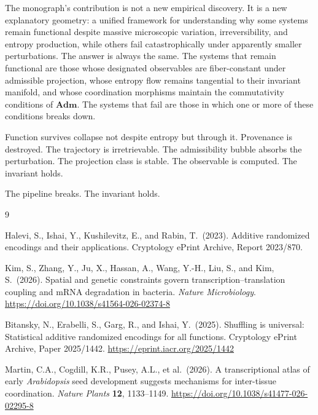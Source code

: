 \documentclass[12pt, a4paper]{article}
\theoremstyle{essaystyle}
\begin{document}
The monograph's contribution is not a new empirical discovery. It is a new
explanatory geometry: a unified framework for understanding why some systems remain
functional despite massive microscopic variation, irreversibility, and entropy
production, while others fail catastrophically under apparently smaller perturbations.
The answer is always the same. The systems that remain functional are those whose
designated observables are fiber-constant under admissible projection, whose entropy
flow remains tangential to their invariant manifold, and whose coordination morphisms
maintain the commutativity conditions of $\mathbf{Adm}$. The systems that fail are
those in which one or more of these conditions breaks down.

Function survives collapse not despite entropy but through it. Provenance is destroyed.
The trajectory is irretrievable. The admissibility bubble absorbs the perturbation.
The projection class is stable. The observable is computed. The invariant holds.

The pipeline breaks. The invariant holds.

\newpage

\begin{thebibliography}{9}

Halevi, S., Ishai, Y., Kushilevitz, E., and Rabin, T.\ (2023).
Additive randomized encodings and their applications.
Cryptology ePrint Archive, Report 2023/870.

Kim, S., Zhang, Y., Ju, X., Hassan, A., Wang, Y.-H., Liu, S., and Kim, S.\ (2026).
Spatial and genetic constraints govern transcription--translation coupling
and mRNA degradation in bacteria.
\textit{Nature Microbiology}.
\url{https://doi.org/10.1038/s41564-026-02374-8}

Bitansky, N., Erabelli, S., Garg, R., and Ishai, Y.\ (2025).
Shuffling is universal: Statistical additive randomized encodings for all functions.
Cryptology ePrint Archive, Paper 2025/1442.
\url{https://eprint.iacr.org/2025/1442}

Martin, C.A., Cogdill, K.R., Pusey, A.L., et al.\ (2026).
A transcriptional atlas of early \textit{Arabidopsis} seed development suggests
mechanisms for inter-tissue coordination.
\textit{Nature Plants} \textbf{12}, 1133--1149.
\url{https://doi.org/10.1038/s41477-026-02295-8}

\end{thebibliography}
\end{document}
